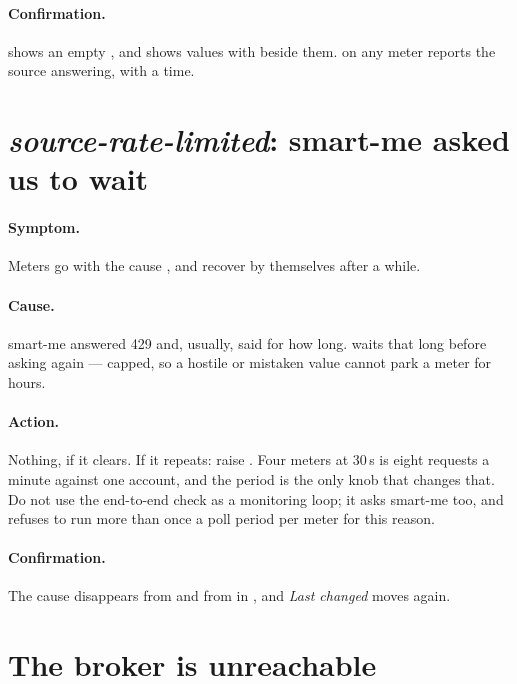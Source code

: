 \paragraph{Confirmation.}  shows an empty , and
 shows values with  beside them.  on any meter reports
the source answering, with a time.

\section{\emph{source-rate-limited}: smart-me asked us to wait}
\label{sec:trouble-429}

\paragraph{Symptom.} Meters go  with the cause , and
recover by themselves after a while.

\paragraph{Cause.} smart-me answered 429 and, usually, said for how long. \prog waits that
long before asking again --- capped, so a hostile or mistaken value cannot park a meter for
hours.

\paragraph{Action.} Nothing, if it clears. If it repeats: raise .
Four meters at 30\,s is eight requests a minute against one account, and the period is the only
knob that changes that. Do not use the end-to-end check as a monitoring loop; it asks smart-me
too, and refuses to run more than once a poll period per meter for this reason.

\paragraph{Confirmation.} The cause disappears from  and from
 in , and \emph{Last changed} moves again.

\section{The broker is unreachable}
\label{sec:trouble-broker}

